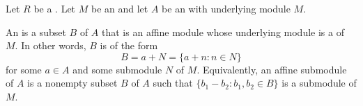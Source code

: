 \begin{definition} \label{definition:affine_submodule_of_an_affine_module_over_a_ring}
    Let $R$ be a . Let $M$ be an  and let $A$ be an  with underlying module $M$. 

    An  is a subset $B$ of $A$ that is an affine module whose underlying module is a  of $M$. In other words, $B$ is of the form
    $$B = a + N = \{a + n: n \in N\}$$
    for some $a \in A$ and some submodule $N$ of $M$. Equivalently, an affine submodule of $A$ is a nonempty subset $B$ of $A$ such that $\{b_1-b_2: b_1,b_2 \in B\}$ is a submodule of $M$.
\end{definition}